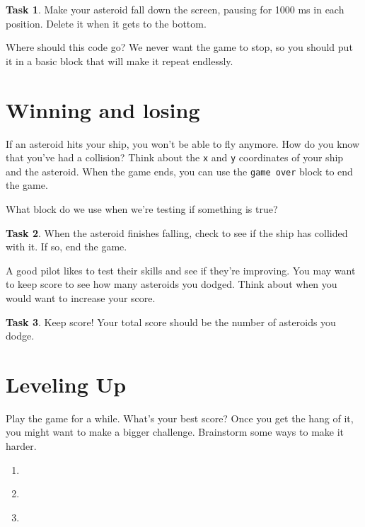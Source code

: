 \documentclass[11pt]{article}
\theoremstyle{definition}
\newtheorem{task}{Task}
\begin{document}
\begin{task}
Make your asteroid fall down the screen, pausing for 1000 ms
in each position. Delete it when it gets to the bottom.
\end{task}

Where should this code go? We never want the game to stop, so you should put it
in a basic block that will make it repeat endlessly.

\section{Winning and losing}
If an asteroid hits your ship, you won't be able to fly anymore. How do you know
that you've had a collision? Think about the \texttt{x} and \texttt{y}
coordinates of your ship and the asteroid. When the game ends, you can use the
\texttt{game over} block to end the game.

What block do we use when we're testing if something is true? 

\begin{task}
When the asteroid finishes falling, check to see if the ship
has collided with it. If so, end the game.
\end{task}

A good pilot likes to test their skills and see if they're improving. You may want to keep score to see how many asteroids you dodged. Think about when you would want to increase your score.

\begin{task}
Keep score! Your total score should be the number of asteroids you dodge.
\end{task}

\section{Leveling Up}

Play the game for a while. What's your best score? Once you get the hang of it, you might want to make a bigger challenge. Brainstorm some ways to make it harder.
\begin{enumerate}
\item \underline{\hspace{\linewidth}}
\item \underline{\hspace{\linewidth}}
\item \underline{\hspace{\linewidth}}
\end{enumerate}
\end{document}

